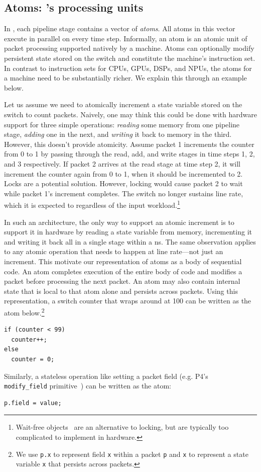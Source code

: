 \subsection{Atoms: \absmachine's processing units}
\label{ss:atoms}

In \absmachine, each pipeline stage contains a vector of \textit{atoms}. All
atoms in this vector execute in parallel on every time step.  Informally, an
atom is an atomic unit of packet processing supported natively by a \absmachine
machine. Atoms can optionally modify persistent state stored on the switch
and constitute the machine's instruction set.  In contrast to instruction sets for
CPUs, GPUs, DSPs, and NPUs, the atoms for a \absmachine machine need to be
substantially richer. We explain this through an example below.

Let us assume we need to atomically increment a state variable stored on the
switch to count packets. Naively, one may think this could be done with
hardware support for three simple operations: \textit{reading} some memory from
one pipeline stage, \textit{adding} one in the next, and \textit{writing} it
back to memory in the third. However, this doesn't provide atomicity. Assume
packet 1 increments the counter from 0 to 1 by passing through the read, add,
and write stages in time steps 1, 2, and 3 respectively.  If packet 2 arrives
at the read stage at time step 2, it will increment the counter again from 0 to
1, when it should be incremented to 2. Locks are a potential solution. However,
locking would cause packet 2 to wait while packet 1's increment completes. The
switch no longer sustains line rate, which it is expected to regardless of the
input workload.\footnote{Wait-free objects~\cite{herlihy_wait} are an
alternative to locking, but are typically too complicated to implement in
hardware.}

In such an architecture, the only way to support an atomic increment is to
support it in hardware by reading a state variable from memory, incrementing it
and writing it back all in a single stage within a ns. The same observation
applies to any atomic operation that needs to happen at line rate---not just an
increment.  This motivate our representation of atoms as a body of sequential
code. An atom completes execution of the entire body of code and modifies a
packet before processing the next packet.  An atom may also contain internal
state that is local to that atom alone and persists across packets.  Using this
representation, a switch counter that wraps around at 100 can be written as the
atom below.\footnote{We use {\tt p.x} to represent field {\tt x} within a
  packet {\tt p} and {\tt x} to represent a state variable {\tt x} that
  persists across packets.}
\begin{lstlisting}[style=customc, numbers=none, frame=none]
if (counter < 99)
  counter++;
else
  counter = 0;
\end{lstlisting}
Similarly, a stateless operation like setting a packet field (e.g. P4's {\tt
modify\_field} primitive~\cite{p4spec}) can be written as the atom:
\begin{lstlisting}[style=customc, numbers=none, frame=none]
  p.field = value;
\end{lstlisting}

